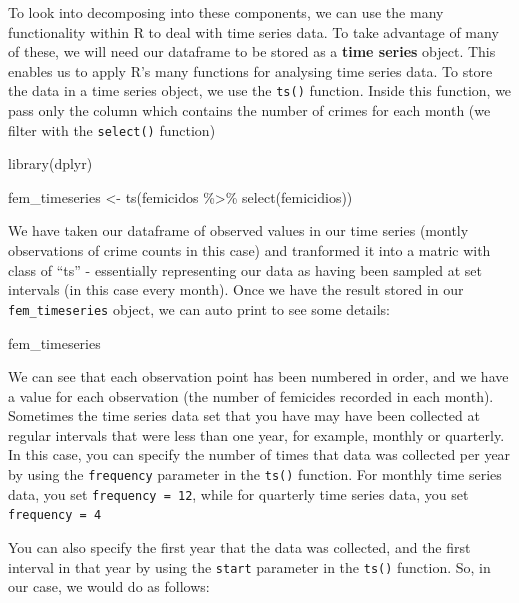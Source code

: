 \documentclass[
  krantz2]{krantz}
\makeatletter
\newenvironment{Shaded}{\begin{snugshade}}{\end{snugshade}}
\newcommand{\FunctionTok}[1]{\textcolor[rgb]{0,0,0}{#1}}
\newcommand{\NormalTok}[1]{#1}
\newcommand{\OtherTok}[1]{\textcolor[rgb]{0.37,0.37,0.37}{#1}}
\newcommand{\SpecialCharTok}[1]{\textcolor[rgb]{0,0,0}{#1}}
\newenvironment{kframe}{%
\medskip{}
\setlength{\fboxsep}{.8em}
 \def\at@end@of@kframe{}%
 \ifinner\ifhmode%
  \def\at@end@of@kframe{\end{minipage}}%
  \begin{minipage}{\columnwidth}%
 \fi\fi%
 \def\FrameCommand##1{\hskip\@totalleftmargin \hskip-\fboxsep
 \colorbox{shadecolor}{##1}\hskip-\fboxsep
     \hskip-\linewidth \hskip-\@totalleftmargin \hskip\columnwidth}%
 \MakeFramed {\advance\hsize-\width
   \@totalleftmargin\z@ \linewidth\hsize
   \@setminipage}}%
 {\par\unskip\endMakeFramed%
 \at@end@of@kframe}
\renewenvironment{Shaded}{\begin{kframe}}{\end{kframe}}
\makeatother
\begin{document}
To look into decomposing into these components, we can use the many functionality within R to deal with time series data. To take advantage of many of these, we will need our dataframe to be stored as a \textbf{time series} object. This enables us to apply R's many functions for analysing time series data. To store the data in a time series object, we use the \texttt{ts()} function. Inside this function, we pass only the column which contains the number of crimes for each month (we filter with the \texttt{select()} function)

\begin{Shaded}
\begin{Highlighting}[]
\FunctionTok{library}\NormalTok{(dplyr)}
 
\NormalTok{fem\_timeseries }\OtherTok{\textless{}{-}} \FunctionTok{ts}\NormalTok{(femicidos }\SpecialCharTok{\%\textgreater{}\%} 
                       \FunctionTok{select}\NormalTok{(femicidios))}
\end{Highlighting}
\end{Shaded}

We have taken our dataframe of observed values in our time series (montly observations of crime counts in this case) and tranformed it into a matric with class of ``ts'' - essentially representing our data as having been sampled at set intervals (in this case every month). Once we have the result stored in our \texttt{fem\_timeseries} object, we can auto print to see some details:

\begin{Shaded}
\begin{Highlighting}[]
\NormalTok{fem\_timeseries}
\end{Highlighting}
\end{Shaded}

We can see that each observation point has been numbered in order, and we have a value for each observation (the number of femicides recorded in each month). Sometimes the time series data set that you have may have been collected at regular intervals that were less than one year, for example, monthly or quarterly. In this case, you can specify the number of times that data was collected per year by using the \texttt{frequency} parameter in the \texttt{ts()} function. For monthly time series data, you set \texttt{frequency\ =\ 12}, while for quarterly time series data, you set \texttt{frequency\ =\ 4}

You can also specify the first year that the data was collected, and the first interval in that year by using the \texttt{start} parameter in the \texttt{ts()} function. So, in our case, we would do as follows:
\end{document}
